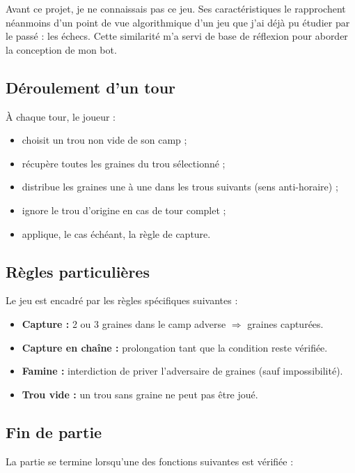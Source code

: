 \documentclass[11pt,a4paper]{article}
\begin{document}
Avant ce projet, je ne connaissais pas ce jeu. Ses caractéristiques le rapprochent néanmoins d'un point de vue algorithmique
d'un jeu que j'ai déjà pu étudier par le passé : les échecs. Cette similarité m'a servi de base de réflexion pour aborder
la conception de mon bot.

\subsection{Déroulement d'un tour}

À chaque tour, le joueur :

\begin{itemize}
  \item choisit un trou non vide de son camp ;
  \item récupère toutes les graines du trou sélectionné ;
  \item distribue les graines une à une dans les trous suivants (sens anti-horaire) ;
  \item ignore le trou d'origine en cas de tour complet ;
  \item applique, le cas échéant, la règle de capture.
\end{itemize}

\subsection{Règles particulières}

Le jeu est encadré par les règles spécifiques suivantes :

\begin{itemize}
  \item \textbf{Capture :} 2 ou 3 graines dans le camp adverse $\Rightarrow$ graines capturées.
  \item \textbf{Capture en chaîne :} prolongation tant que la condition reste vérifiée.
  \item \textbf{Famine :} interdiction de priver l'adversaire de graines (sauf impossibilité).
  \item \textbf{Trou vide :} un trou sans graine ne peut pas être joué.
\end{itemize}

\subsection{Fin de partie}

La partie se termine lorsqu'une des fonctions suivantes est vérifiée :
\end{document}
